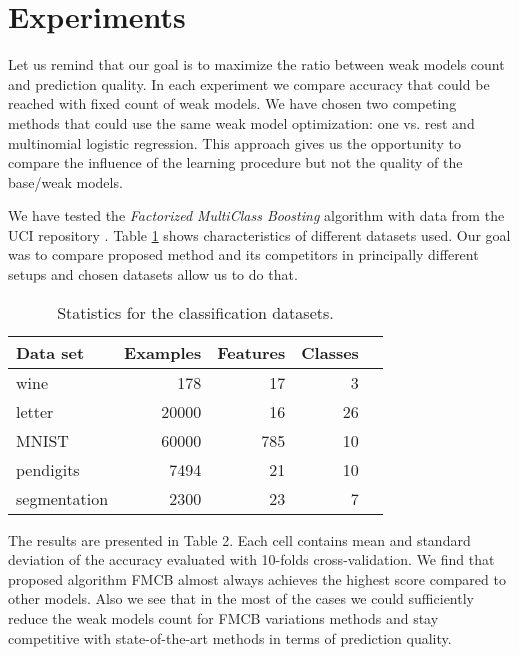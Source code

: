 \documentclass{article}
\begin{document}
\section{Experiments} \label{experiments}
Let us remind that our goal is to maximize the ratio between weak models count and prediction quality. In each experiment we compare accuracy that could be reached with fixed count of weak models. We have chosen two competing methods that could use the same weak model optimization: one vs. rest and multinomial logistic regression. This approach gives us the opportunity to compare the influence of the learning procedure but not the quality of the base/weak models.

We have tested the \emph{Factorized MultiClass Boosting} algorithm with data from the UCI repository \cite{uciRepo}. Table \ref{datasets} shows characteristics of different datasets used. Our goal was to compare proposed method and its competitors in principally different setups and chosen datasets allow us to do that.

\begin{table}[t]
\caption{Statistics for the classification datasets.}
\label{datasets}
\vskip 0.15in
\begin{center}
\begin{small}
\begin{sc}
\begin{tabular}{lrrrr}
\hline
\abovespace\belowspace
Data set & Examples & Features & Classes \\
\hline
\abovespace
wine     		& 178 	& 17 	& 3     \\
letter    		& 20000 & 16 	& 26 	\\
MNIST     		& 60000 & 785 	& 10    \\
pendigits 		& 7494 	& 21 	& 10 	\\
segmentation    & 2300 	& 23 	& 7     \\
\hline
\end{tabular}
\end{sc}
\end{small}
\end{center}
\vskip -0.1in
\end{table}


 
The results are presented in Table 2. Each cell contains mean and standard deviation of the accuracy evaluated with 10-folds cross-validation. We find that proposed algorithm FMCB almost always achieves the highest score compared to other models. Also we see that in the most of the cases we could sufficiently reduce the weak models count for FMCB variations methods and stay competitive with state-of-the-art methods in terms of prediction quality.
\end{document}
